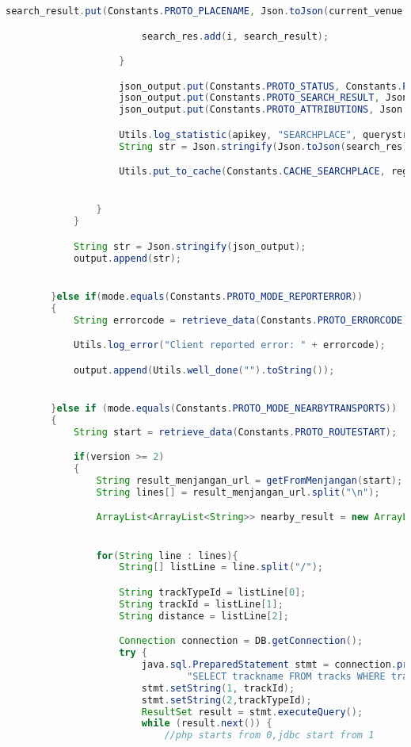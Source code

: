\begin{lstlisting}[language=Java,basicstyle=\tiny,caption=Application.java]
                        search_result.put(Constants.PROTO_PLACENAME, Json.toJson(current_venue.get("name").textValue()));

                        search_res.add(i, search_result);

                    }

                    json_output.put(Constants.PROTO_STATUS, Constants.PROTO_STATUS_OK);
                    json_output.put(Constants.PROTO_SEARCH_RESULT, Json.toJson(search_res));
                    json_output.put(Constants.PROTO_ATTRIBUTIONS, Json.toJson(NullNode.getInstance()));

                    Utils.log_statistic(apikey, "SEARCHPLACE", querystring + "/" + size);
                    String str = Json.stringify(Json.toJson(search_res));

                    Utils.put_to_cache(Constants.CACHE_SEARCHPLACE, region + "/" + querystring, str);


                }
            }

            String str = Json.stringify(json_output);
            output.append(str);


        }else if(mode.equals(Constants.PROTO_MODE_REPORTERROR))
        {
            String errorcode = retrieve_data(Constants.PROTO_ERRORCODE);

            Utils.log_error("Client reported error: " + errorcode);

            output.append(Utils.well_done("").toString());


        }else if (mode.equals(Constants.PROTO_MODE_NEARBYTRANSPORTS))
        {
            String start = retrieve_data(Constants.PROTO_ROUTESTART);

            if(version >= 2)
            {
                String result_menjangan_url = getFromMenjangan(start);
                String lines[] = result_menjangan_url.split("\n");

                ArrayList<ArrayList<String>> nearby_result = new ArrayList<ArrayList<String>>();


                for(String line : lines){
                    String[] listLine = line.split("/");

                    String trackTypeId = listLine[0];
                    String trackId = listLine[1];
                    String distance = listLine[2];

                    Connection connection = DB.getConnection();
                    try {
                        java.sql.PreparedStatement stmt = connection.prepareStatement(
                                "SELECT trackname FROM tracks WHERE trackId = ? AND trackTypeId = ?");
                        stmt.setString(1, trackId);
                        stmt.setString(2,trackTypeId);
                        ResultSet result = stmt.executeQuery();
                        while (result.next()) {
                            //php starts from 0,jdbc start from 1


\end{lstlisting}
